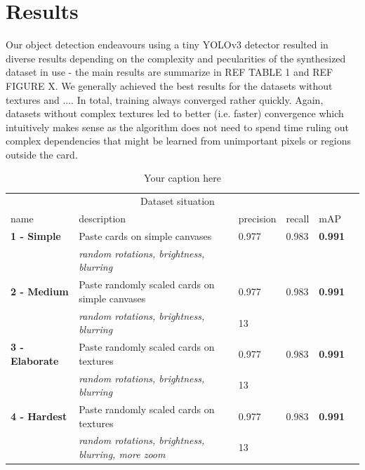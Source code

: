 \documentclass[a4paper]{article}
\begin{document}
\section{Results}
Our object detection endeavours using a tiny YOLOv3 detector resulted in diverse results depending on the complexity and pecularities of the synthesized dataset in use - the main results are summarize in REF TABLE 1 and REF FIGURE X. We generally achieved the best results for the datasets without textures and ....
In total, training always converged rather quickly. Again, datasets without complex textures led to better (i.e. faster) convergence which intuitively makes sense as the algorithm does not need to spend time ruling out complex dependencies that might be learned from unimportant pixels or regions outside the card.\\
\begin{table}[h]

\begin{tabular}{lllllr}
\hline
\multicolumn{5}{c}{Dataset situation} \\
\cline{1-2}
name    & description  & precision & recall & mAP \\
\hline
\textbf{1 - Simple}      & Paste cards on simple canvases    &  0.977  & 0.983 & \textbf{0.991} \\
          & \textit{random rotations, brightness, blurring}     &  & & \\
\textbf{2 - Medium}      & Paste randomly scaled cards on simple canvases & 0.977 & 0.983 & \textbf{0.991} \\
          & \textit{random rotations, brightness, blurring}     &  13 & & \\
\textbf{3 - Elaborate}       & Paste randomly scaled cards on textures & 0.977 & 0.983 & \textbf{0.991} \\
          & \textit{random rotations, brightness, blurring}     &  13 & & \\
\textbf{4 - Hardest} & Paste randomly scaled cards on textures & 0.977 & 0.983 & \textbf{0.991} \\
          & \textit{random rotations, brightness, blurring, more zoom}     &  13 & & \\
\hline


\end{tabular}
\caption{Your caption here} 
\end{table}
\end{document}

